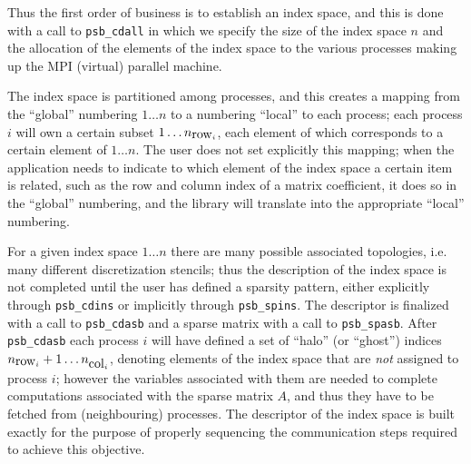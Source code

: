 Thus the first order of business is to establish an index space, and
this is done with a call to  \verb|psb_cdall| in which we specify the
size of the index space $n$ and the allocation of the elements of the
index space to the various processes making up the MPI (virtual)
parallel machine. 

The index space is partitioned among processes, and this creates a
mapping from the ``global'' numbering $1\dots n$ to a numbering
``local'' to each process; each process $i$ will own a certain subset
$1\dots n_{\hbox{row}_i}$, each element of which corresponds to a certain
element of $1\dots n$. The user does not set explicitly this mapping;
when the application needs to indicate to which element of the index
space a certain item is related, such as the row and column index of a
matrix coefficient, it does so in the ``global'' numbering, and the
library will translate into the appropriate ``local'' numbering. 

For  a given index space $1\dots n$ there are many possible associated
topologies, i.e. many different discretization stencils; thus the
description of the index space is not completed until the user has
defined a sparsity pattern, either explicitly through \verb|psb_cdins|
or implicitly through \verb|psb_spins|. The descriptor is finalized
with a call to \verb|psb_cdasb| and a sparse matrix with a call to
\verb|psb_spasb|. After \verb|psb_cdasb| each process $i$ will have
defined a set of ``halo'' (or ``ghost'') indices
$n_{\hbox{row}_i}+1\dots n_{\hbox{col}_i}$, denoting elements of the index
space that are \emph{not} assigned to process $i$; however the
variables associated with them are needed to complete computations
associated with the sparse matrix $A$, and thus they have to be
fetched from (neighbouring) processes. The descriptor of the index
space is built exactly for the purpose of properly sequencing the
communication steps required to achieve this objective. 

